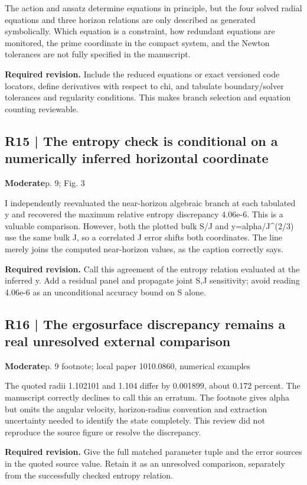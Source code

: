 \documentclass[10pt,a4paper]{article}
\begin{document}
The action and ansatz determine equations in principle, but the four solved radial equations and three horizon relations are only described as generated symbolically. Which equation is a constraint, how redundant equations are monitored, the prime coordinate in the compact system, and the Newton tolerances are not fully specified in the manuscript.

\textbf{Required revision.} Include the reduced equations or exact versioned code locators, define derivatives with respect to chi, and tabulate boundary/solver tolerances and regularity conditions. This makes branch selection and equation counting reviewable.

\subsection*{R15 | The entropy check is conditional on a numerically inferred horizontal coordinate}
\textbf{Moderate}\quad p. 9; Fig. 3

I independently reevaluated the near-horizon algebraic branch at each tabulated y and recovered the maximum relative entropy discrepancy 4.06e-6. This is a valuable comparison. However, both the plotted bulk S/J and y=alpha/J\textasciicircum{}(2/3) use the same bulk J, so a correlated J error shifts both coordinates. The line merely joins the computed near-horizon values, as the caption correctly says.

\textbf{Required revision.} Call this agreement of the entropy relation evaluated at the inferred y. Add a residual panel and propagate joint S,J sensitivity; avoid reading 4.06e-6 as an unconditional accuracy bound on S alone.

\subsection*{R16 | The ergosurface discrepancy remains a real unresolved external comparison}
\textbf{Moderate}\quad p. 9 footnote; local paper 1010.0860, numerical examples

The quoted radii 1.102101 and 1.104 differ by 0.001899, about 0.172 percent. The manuscript correctly declines to call this an erratum. The footnote gives alpha but omits the angular velocity, horizon-radius convention and extraction uncertainty needed to identify the state completely. This review did not reproduce the source figure or resolve the discrepancy.

\textbf{Required revision.} Give the full matched parameter tuple and the error sources in the quoted source value. Retain it as an unresolved comparison, separately from the successfully checked entropy relation.
\end{document}
